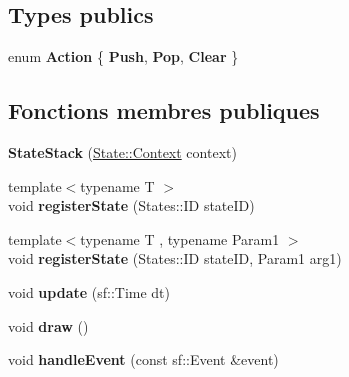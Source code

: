 \subsection*{Types publics}
\begin{DoxyCompactItemize}
\item 
\hypertarget{class_state_stack_af804142a55cd477767353e0abbcc218c}{}\label{class_state_stack_af804142a55cd477767353e0abbcc218c} 
enum {\bfseries Action} \{ {\bfseries Push}, 
{\bfseries Pop}, 
{\bfseries Clear}
 \}
\end{DoxyCompactItemize}
\subsection*{Fonctions membres publiques}
\begin{DoxyCompactItemize}
\item 
\hypertarget{class_state_stack_a365f29afd04a9370f6638cbe3b4ff92a}{}\label{class_state_stack_a365f29afd04a9370f6638cbe3b4ff92a} 
{\bfseries State\+Stack} (\hyperlink{struct_state_1_1_context}{State\+::\+Context} context)
\item 
\hypertarget{class_state_stack_a9d64daa479c2cccad6f2ede77741a352}{}\label{class_state_stack_a9d64daa479c2cccad6f2ede77741a352} 
{\footnotesize template$<$typename T $>$ }\\void {\bfseries register\+State} (States\+::\+ID state\+ID)
\item 
\hypertarget{class_state_stack_a839a5f12e77dd8c7dc013f06d5170fa6}{}\label{class_state_stack_a839a5f12e77dd8c7dc013f06d5170fa6} 
{\footnotesize template$<$typename T , typename Param1 $>$ }\\void {\bfseries register\+State} (States\+::\+ID state\+ID, Param1 arg1)
\item 
\hypertarget{class_state_stack_ae90af9f56ce7774d47d0407e2680c27d}{}\label{class_state_stack_ae90af9f56ce7774d47d0407e2680c27d} 
void {\bfseries update} (sf\+::\+Time dt)
\item 
\hypertarget{class_state_stack_a0990b973b2a0bdf8fad2f326e564931a}{}\label{class_state_stack_a0990b973b2a0bdf8fad2f326e564931a} 
void {\bfseries draw} ()
\item 
\hypertarget{class_state_stack_a70d3ffad9da499b8356789115f3e2acf}{}\label{class_state_stack_a70d3ffad9da499b8356789115f3e2acf} 
void {\bfseries handle\+Event} (const sf\+::\+Event \&event)
\item 
\hypertarget{class_state_stack_a80ed85f0fc13039e6f4c7dfef19e608f}{}\label{class_state_stack_a80ed85f0fc13039e6f4c7dfef19e608f} 

\end{DoxyCompactItemize}
